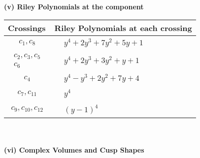 \documentclass[1p]{elsarticle_modified}
\theoremstyle{definition}
\begin{document}
\newpage\renewcommand{\arraystretch}{1}
\flushleft \textbf{(v) Riley Polynomials at the component}\newline \\
\begin{tabular}{m{50pt}|m{274pt}}
Crossings & \hspace{64pt}Riley Polynomials at each crossing \\
\hline $$\begin{aligned}c_{1},c_{8}\end{aligned}$$&$\begin{aligned}
&y^4+2 y^3+7 y^2+5 y+1
\end{aligned}$\\
\hline $$\begin{aligned}c_{2},c_{3},c_{5}\\c_{6}\end{aligned}$$&$\begin{aligned}
&y^4+2 y^3+3 y^2+y+1
\end{aligned}$\\
\hline $$\begin{aligned}c_{4}\end{aligned}$$&$\begin{aligned}
&y^4- y^3+2 y^2+7 y+4
\end{aligned}$\\
\hline $$\begin{aligned}c_{7},c_{11}\end{aligned}$$&$\begin{aligned}
&y^4
\end{aligned}$\\
\hline $$\begin{aligned}c_{9},c_{10},c_{12}\end{aligned}$$&$\begin{aligned}
&(y-1)^4
\end{aligned}$\\
\hline
\end{tabular}\\~\\
\newpage\flushleft \textbf{(vi) Complex Volumes and Cusp Shapes}
\end{document}
